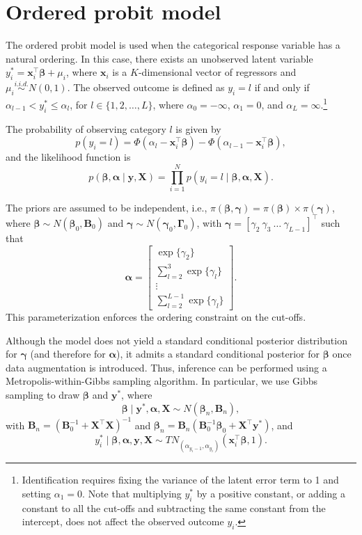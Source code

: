 \section{Ordered probit model}\label{sec66}

The ordered probit model is used when the categorical response variable has a natural ordering. In this case, there exists an unobserved latent variable $y_i^* = \bm{x}_i^{\top}\bm{\beta} + \mu_i$, where $\bm{x}_i$ is a $K$-dimensional vector of regressors and $\mu_i \stackrel{i.i.d.}{\sim} N(0,1)$. The observed outcome is defined as $y_i = l$ if and only if $\alpha_{l-1} < y_i^* \leq \alpha_l$, for $l \in \{1, 2, \dots, L\}$, where $\alpha_0 = -\infty$, $\alpha_1 = 0$, and $\alpha_L = \infty$.\footnote{Identification requires fixing the variance of the latent error term to 1 and setting $\alpha_1 = 0$. Note that multiplying $y_i^*$ by a positive constant, or adding a constant to all the cut-offs and subtracting the same constant from the intercept, does not affect the observed outcome $y_i$.} 

The probability of observing category $l$ is given by
\[
p(y_i = l) = \Phi(\alpha_l - \bm{x}_i^{\top}\bm{\beta}) - \Phi(\alpha_{l-1} - \bm{x}_i^{\top}\bm{\beta}),
\]
and the likelihood function is
\[
p(\bm{\beta}, \bm{\alpha} \mid \bm{y}, \bm{X}) = \prod_{i=1}^{N} p(y_i = l \mid \bm{\beta}, \bm{\alpha}, \bm{X}).
\]

The priors are assumed to be independent, i.e., $\pi(\bm{\beta}, \bm{\gamma}) = \pi(\bm{\beta}) \times \pi(\bm{\gamma})$, where $\bm{\beta} \sim N(\bm{\beta}_0, \bm{B}_0)$ and $\bm{\gamma} \sim N(\bm{\gamma}_0, \bm{\Gamma}_0)$, with $\bm{\gamma} = [\gamma_2 \ \gamma_3 \ \dots \ \gamma_{L-1}]^{\top}$ such that
\[
\bm{\alpha} = 
\begin{bmatrix}
	\exp\{\gamma_2\} \\ 
	\sum_{l=2}^{3} \exp\{\gamma_l\} \\ 
	\vdots \\ 
	\sum_{l=2}^{L-1} \exp\{\gamma_l\}
\end{bmatrix}.
\]
This parameterization enforces the ordering constraint on the cut-offs.

Although the model does not yield a standard conditional posterior distribution for $\bm{\gamma}$ (and therefore for $\bm{\alpha}$), it admits a standard conditional posterior for $\bm{\beta}$ once data augmentation is introduced. Thus, inference can be performed using a Metropolis-within-Gibbs sampling algorithm. In particular, we use Gibbs sampling to draw $\bm{\beta}$ and $\bm{y}^*$, where
\[
\bm{\beta} \mid \bm{y}^*, \bm{\alpha}, \bm{X} \sim N(\bm{\beta}_n, \bm{B}_n),
\]
with $\bm{B}_n = (\bm{B}_0^{-1} + \bm{X}^{\top}\bm{X})^{-1}$ and $\bm{\beta}_n = \bm{B}_n(\bm{B}_0^{-1}\bm{\beta}_0 + \bm{X}^{\top}\bm{y}^*)$, and
\[
y_i^* \mid \bm{\beta}, \bm{\alpha}, \bm{y}, \bm{X} \sim TN_{(\alpha_{y_i-1}, \alpha_{y_i})}(\bm{x}_i^{\top}\bm{\beta}, 1).
\]

